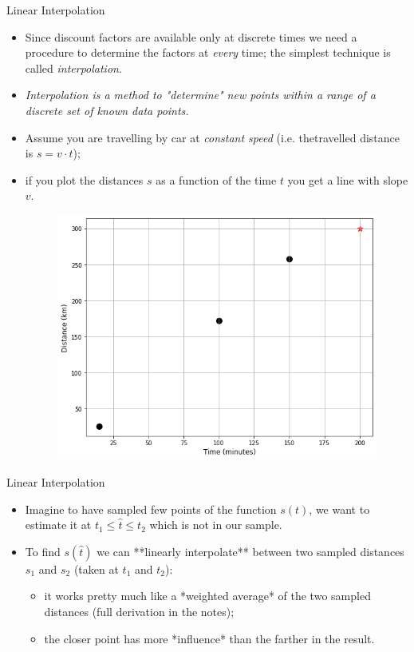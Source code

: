 \documentclass{beamer}
\begin{document}
\begin{frame}{Linear Interpolation}
  \begin{itemize}
  \item Since discount factors are available only at discrete times we need a procedure to determine the factors at \emph{every} time; the simplest technique is called \emph{interpolation}.
  \item \emph{Interpolation is a method to "determine" new points within a range of a discrete set of known data points.}
  \item Assume you are travelling by car at \emph{constant speed} (i.e. thetravelled distance is $s = v \cdot t$);
  \item if you plot the distances $s$ as a function of the time $t$ you get a line with slope $v$.
    \begin{figure}[h]
      \begin{center}
        \includegraphics[width=0.55\linewidth]{interp1}
      \end{center}
    \end{figure}
  \end{itemize}
\end{frame}

\begin{frame}{Linear Interpolation}
  \begin{itemize}
  \item Imagine to have sampled few points of the function $s(t)$, we want to estimate it at $t_1 \leq \hat{t} \leq t_2$ which is not in our sample.
  \item To find $s(\hat{t})$ we can **linearly interpolate** between two sampled distances $s_1$ and $s_2$ (taken at $t_1$ and $t_2$):
    \begin{itemize}
    \item it works pretty much like a *weighted average* of the two sampled distances (full derivation in the notes);
    \item the closer point has more *influence* than the farther in the result.
    \end{itemize}
  \end{itemize}
\end{frame}
\end{document}

